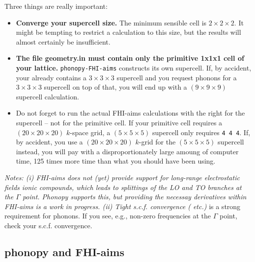 Three things are really important:
\begin{itemize}
\item {\bf Converge your supercell size.} The minimum sensible cell
  is $2\times 2\times 2$. It might be tempting to restrict a
  calculation to this size, but the results will almost certainly be
  insufficient. 
\item {\bf The file geometry.in must contain only the primitive 1x1x1
  cell of your lattice.} \texttt{phonopy-FHI-aims} constructs its own  
  supercell. If, by accident, your  already
  contains a $3\times3\times3$ supercell and you request phonons for a
  $3\times3\times3$ supercell on top of that, you will end up with a 
  $(9\times 9\times 9)$ supercell calculation. 
\item Do not forget to run the actual FHI-aims calculations with the
  right  for the supercell -- not for the primitive
  cell. If your primitive cell requires a $(20\times 20\times 20)$
  $k$-space grid, a $(5\times 5\times 5)$ supercell only requires
   \texttt{4 4 4}. If, by accident, you use a
  $(20\times 20\times 20)$ $k$-grid for the $(5\times 5\times 5)$
  supercell instead, you will pay with a disproportionately large
  amoung of computer time, 125 times more time than what you should have
  been using. 
\end{itemize}

\emph{Notes: (i)
  FHI-aims does not (yet) provide support for long-range electrostatic
  fields ionic compounds, which leads to splittings of the LO and TO
  branches at the $\Gamma$ point. Phonopy supports this, but providing
  the necessay derivatives within FHI-aims is a work in progress. (ii)
  Tight s.c.f. convergence ( etc.)} is a
  strong requirement for phonons. If you see, e.g., non-zero
  frequencies at the $\Gamma$ point, check your s.c.f. convergence.


\subsection*{phonopy and FHI-aims}

